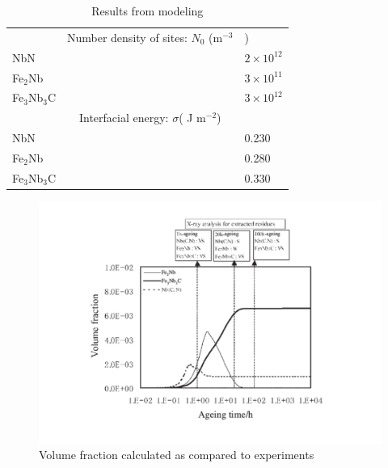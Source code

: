 \documentclass[12pt]{article}
\begin{document}
\begin{table}
\centering
\caption{Results from modeling}
\begin{tabular}{ l c l }
\hline
 & Number density of sites: $N_0$ (m$^{-3}$&) \\
NbN & & $2\times10^{12}$ \\
Fe$_2$Nb & & $3\times10^{11}$ \\
Fe$_3$Nb$_3$C & & $3\times10^{12}$ \\
 & Interfacial energy: $\sigma$( J m$^{-2}$) & \\
NbN & &  0.230\\
Fe$_2$Nb & & 0.280 \\
Fe$_3$Nb$_3$C & & 0.330 \\
\hline
\end{tabular}
\label{tab:res}
\end{table}
\begin{figure}
\centering
\includegraphics[width=14cm]{vol.pdf}
\caption{Volume fraction calculated as compared to experiments}
\label{fig:vol}
\end{figure}
\end{document}
